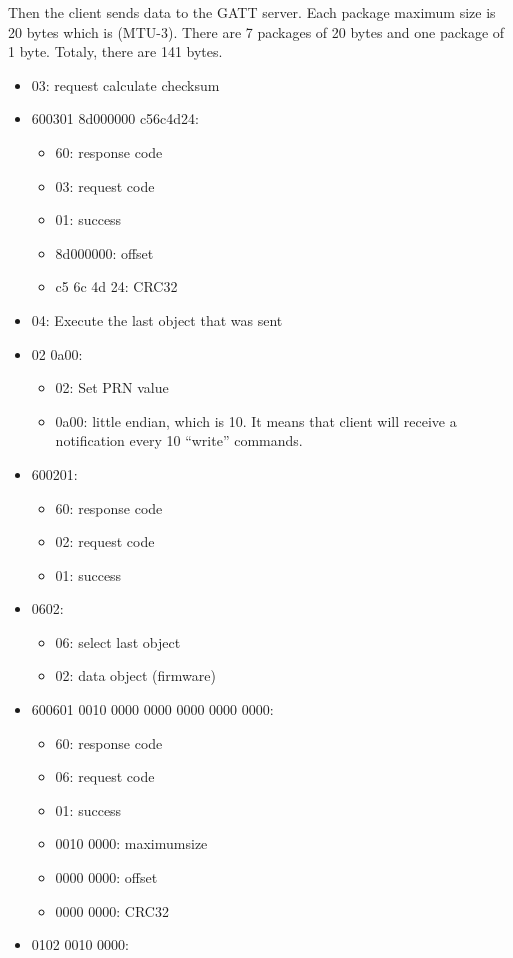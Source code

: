 Then the client sends data to the GATT server. Each package maximum size
is 20 bytes which is (MTU-3). There are 7 packages of 20 bytes and one
package of 1 byte. Totaly, there are 141 bytes.

\begin{itemize}
\tightlist
\item
  03: request calculate checksum
\item
  600301 8d000000 c56c4d24:

  \begin{itemize}
  \tightlist
  \item
    60: response code
  \item
    03: request code
  \item
    01: success
  \item
    8d000000: offset
  \item
    c5 6c 4d 24: CRC32
  \end{itemize}
\item
  04: Execute the last object that was sent
\item
  02 0a00:

  \begin{itemize}
  \tightlist
  \item
    02: Set PRN value
  \item
    0a00: little endian, which is 10. It means that client will receive
    a notification every 10 ``write'' commands.
  \end{itemize}
\item
  600201:

  \begin{itemize}
  \tightlist
  \item
    60: response code
  \item
    02: request code
  \item
    01: success
  \end{itemize}
\item
  0602:

  \begin{itemize}
  \tightlist
  \item
    06: select last object
  \item
    02: data object (firmware)
  \end{itemize}
\item
  600601 0010 0000 0000 0000 0000 0000:

  \begin{itemize}
  \tightlist
  \item
    60: response code
  \item
    06: request code
  \item
    01: success
  \item
    0010 0000: maximumsize
  \item
    0000 0000: offset
  \item
    0000 0000: CRC32
  \end{itemize}
\item
  0102 0010 0000:


\end{itemize}
